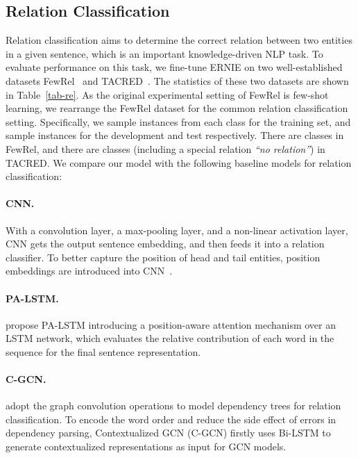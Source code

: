 \documentclass[11pt,a4paper]{article}
\begin{document}
\subsection{Relation Classification}


Relation classification aims to determine the correct relation between two entities in a given sentence, which is an important knowledge-driven NLP task. To evaluate performance on this task, we fine-tune ERNIE on two well-established datasets FewRel~\cite{han2018fewrel} and TACRED~\cite{zhang2017position}. The statistics of these two datasets are shown in Table~\ref{tab-re}. As the original experimental setting of FewRel is few-shot learning, we rearrange the FewRel dataset for the common relation classification setting. Specifically, we sample  instances from each class for the training set, and sample  instances for the development and test respectively. There are  classes in FewRel, and there are  classes (including a special relation \textit{``no relation''}) in TACRED. We compare our model with the following baseline models for relation classification:

\paragraph{CNN.} With a convolution layer, a max-pooling layer, and a non-linear activation layer, CNN gets the output sentence embedding, and then feeds it into a relation classifier. To better capture the position of head and tail entities, position embeddings are introduced into CNN~\cite{zeng2015distant,lin2016neural,wu2017adversarial,han2018hierarchical}.

\paragraph{PA-LSTM.}  propose PA-LSTM introducing a position-aware attention mechanism over an LSTM network, which evaluates the relative contribution of each word in the sequence for the final sentence representation.

\paragraph{C-GCN.}  adopt the graph convolution operations to model dependency trees for relation classification. To encode the word order and reduce the side effect of errors in dependency parsing, Contextualized GCN (C-GCN) firstly uses Bi-LSTM to generate contextualized representations as input for GCN models.
\end{document}
